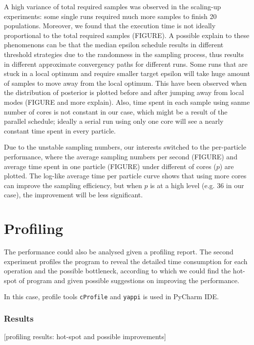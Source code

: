 \documentclass[12pt,a4paper]{report}
\begin{document}
A high variance of total required samples was observed in the scaling-up experiments: some single runs required much more samples to finish 20 populations. Moreover, we found that the execution time is not ideally proportional to the total required samples (FIGURE). A possible explain to these phenomenons can be that the median epsilon schedule results in different threshold strategies due to the randomness in the sampling process, thus results in different approximate convergency paths for different runs. Some runs that are stuck in a local optimum and require smaller target epsilon will take huge amount of samples to move away from the local optimum. This have been observed when the distribution of posterior is plotted before and after jumping away from local modes (FIGURE and more explain). Also, time spent in each sample using sanme number of cores is not constant in our case, which might be a result of the parallel schedule; ideally a serial run using only one core will see a nearly constant time spent in every particle.

Due to the unstable sampling numbers, our interests switched to the per-particle performance, where the average sampling numbers per second (FIGURE) and average time spent in one particle (FIGURE) under different of cores ($p$) are plotted. The log-like average time per particle curve shows that using more cores can improve the sampling efficiency, but when $p$ is at a high level (e.g. 36 in our case), the improvement will be less significant.

\section{Profiling}

The performance could also be analysed given a profiling report. The second experiment profiles the program to reveal the detailed time consumption for each operation and the possible bottleneck, according to which we could find the hot-spot of program and given possible suggestions on improving the performance.

In this case, profile tools \verb|cProfile| and \verb|yappi| is used in PyCharm IDE.

\subsubsection{Results}

[profiling results: hot-spot and possible improvements]
\end{document}
